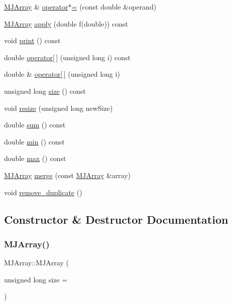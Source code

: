 \begin{DoxyCompactItemize}
\hyperlink{classMJArray}{M\+J\+Array} \& \hyperlink{classMJArray_a22272f9dcbc763c98b67368f6a897aad}{operator$\ast$=} (const double \&operand)
\item 
\hyperlink{classMJArray}{M\+J\+Array} \hyperlink{classMJArray_a7564d3a887e8635f0430263839dfc602}{apply} (double f(double)) const
\item 
void \hyperlink{classMJArray_a0bcd1aaca8e71b17364ae9f00eaf88df}{print} () const
\item 
double \hyperlink{classMJArray_a813a61264d4a763702bec802199fec2c}{operator\mbox{[}$\,$\mbox{]}} (unsigned long i) const
\item 
double \& \hyperlink{classMJArray_a039a83653bc0ba6f8c0aa7c74deb3bd7}{operator\mbox{[}$\,$\mbox{]}} (unsigned long i)
\item 
unsigned long \hyperlink{classMJArray_a997898f10d39bc94bd242c308a85bb72}{size} () const
\item 
void \hyperlink{classMJArray_a06c85b4ded36ba52bd8ca14d712b4b2c}{resize} (unsigned long new\+Size)
\item 
double \hyperlink{classMJArray_ad79c3f21f9d1329546de066b1b3cc9f6}{sum} () const
\item 
double \hyperlink{classMJArray_afb89bd41c6b811616336d4dd7f7697fb}{min} () const
\item 
double \hyperlink{classMJArray_ad96b5b1988e216bece33f8cad1907ebb}{max} () const
\item 
\hyperlink{classMJArray}{M\+J\+Array} \hyperlink{classMJArray_aa7ce6c82b0da3b3a6b691327c83500f0}{merge} (const \hyperlink{classMJArray}{M\+J\+Array} \&array)
\item 
void \hyperlink{classMJArray_adbdbdf57961201fe20593a346f1e3c09}{remove\+\_\+duplicate} ()
\end{DoxyCompactItemize}


\subsection{Constructor \& Destructor Documentation}
\hypertarget{classMJArray_a422fa68b394b9528cca2e8fbaefb10e9}{}\label{classMJArray_a422fa68b394b9528cca2e8fbaefb10e9} 
\subsubsection{\texorpdfstring{M\+J\+Array()}{MJArray()}\hspace{0.1cm}{\footnotesize\ttfamily [1/2]}}
{\footnotesize\ttfamily M\+J\+Array\+::\+M\+J\+Array (\begin{DoxyParamCaption}\item[{unsigned long}]{size = {} }\end{DoxyParamCaption})\hspace{0.3cm}{\ttfamily [explicit]}}

